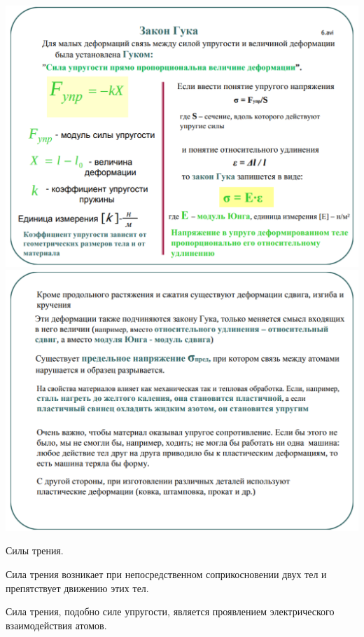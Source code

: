 \centering
\includegraphics[width=0.7\linewidth]{imgs/q5i1.png}
\centering
\includegraphics[width=0.7\linewidth]{imgs/q5i2.png}

\begin{definition}
    Силы трения.

    Сила трения возникает при непосредственном соприкосновении двух тел и препятствует движению этих тел.

    Сила трения, подобно силе упругости, является проявлением электрического взаимодействия атомов.
\end{definition}


